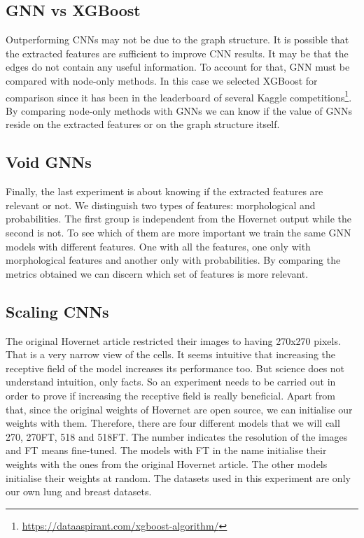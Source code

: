 \subsection{GNN vs XGBoost}\label{subsec:gnn-xgb}

Outperforming CNNs may not be due to the graph structure. It is possible that the extracted features are sufficient to improve CNN results. It may be that the edges do not contain any useful information. To account for that, GNN must be compared with node-only methods. In this case we selected XGBoost \cite{xgboost} for comparison since it has been in the leaderboard of several Kaggle competitions\footnote{\url{https://dataaspirant.com/xgboost-algorithm/}}. By comparing node-only methods with GNNs we can know if the value of GNNs reside on the extracted features or on the graph structure itself.

\subsection{Void GNNs}\label{subsec:void-gnn}

Finally, the last experiment is about knowing if the extracted features are relevant or not. We distinguish two types of features: morphological and probabilities. The first group is independent from the Hovernet output while the second is not. To see which of them are more important we train the same GNN models with different features. One with all the features, one only with morphological features and another only with probabilities. By comparing the metrics obtained we can discern which set of features is more relevant.

\subsection{Scaling CNNs}\label{subsec:scaling}

The original Hovernet article restricted their images to having 270x270 pixels. That is a very narrow view of the cells. It seems intuitive that increasing the receptive field of the model increases its performance too. But science does not understand intuition, only facts. So an experiment needs to be carried out in order to prove if increasing the receptive field is really beneficial. Apart from that, since the original weights of Hovernet are open source, we can initialise our weights with them. Therefore, there are four different models that we will call 270, 270FT, 518 and 518FT. The number indicates the resolution of the images and FT means fine-tuned. The models with FT in the name initialise their weights with the ones from the original Hovernet article. The other models initialise their weights at random. The datasets used in this experiment are only our own lung and breast datasets.